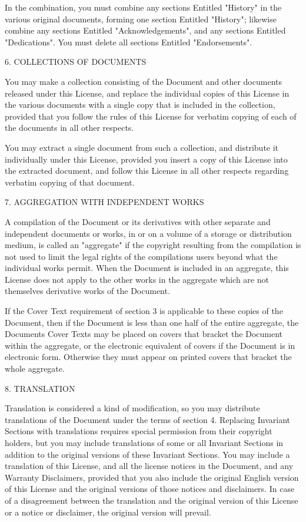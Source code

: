 \documentclass[
  english,
  11pt,
  a4paper,
]{article}
\begin{document}
In the combination, you must combine any sections Entitled "History" in
the various original documents, forming one section Entitled "History";
likewise combine any sections Entitled "Acknowledgements", and any
sections Entitled "Dedications". You must delete all sections Entitled
"Endorsements".

6. COLLECTIONS OF DOCUMENTS

You may make a collection consisting of the Document and other documents
released under this License, and replace the individual copies of this
License in the various documents with a single copy that is included in
the collection, provided that you follow the rules of this License for
verbatim copying of each of the documents in all other respects.

You may extract a single document from such a collection, and distribute
it individually under this License, provided you insert a copy of this
License into the extracted document, and follow this License in all
other respects regarding verbatim copying of that document.

7. AGGREGATION WITH INDEPENDENT WORKS

A compilation of the Document or its derivatives with other separate and
independent documents or works, in or on a volume of a storage or
distribution medium, is called an "aggregate" if the copyright resulting
from the compilation is not used to limit the legal rights of the
compilation\textquotesingle s users beyond what the individual works
permit. When the Document is included in an aggregate, this License does
not apply to the other works in the aggregate which are not themselves
derivative works of the Document.

If the Cover Text requirement of section 3 is applicable to these copies
of the Document, then if the Document is less than one half of the
entire aggregate, the Document\textquotesingle s Cover Texts may be
placed on covers that bracket the Document within the aggregate, or the
electronic equivalent of covers if the Document is in electronic form.
Otherwise they must appear on printed covers that bracket the whole
aggregate.

8. TRANSLATION

Translation is considered a kind of modification, so you may distribute
translations of the Document under the terms of section 4. Replacing
Invariant Sections with translations requires special permission from
their copyright holders, but you may include translations of some or all
Invariant Sections in addition to the original versions of these
Invariant Sections. You may include a translation of this License, and
all the license notices in the Document, and any Warranty Disclaimers,
provided that you also include the original English version of this
License and the original versions of those notices and disclaimers. In
case of a disagreement between the translation and the original version
of this License or a notice or disclaimer, the original version will
prevail.
\end{document}
